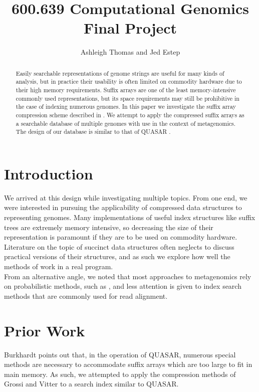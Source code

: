 \documentclass{article}
\begin{document}
\title{600.639 Computational Genomics\\
Final Project}
\date{}
\author{Ashleigh Thomas and Jed Estep}
\maketitle

\begin{abstract}
Easily searchable representations of genome strings are useful for many kinds of analysis, but in practice their usability is often limited on commodity hardware due to their high memory requirements. Suffix arrays are one of the least memory-intensive commonly used representations, but its space requirements may still be prohibitive in the case of indexing numerous genomes. In this paper we investigate the suffix array compression scheme described in \cite{GV05}. We attempt to apply the compressed suffix arrays as a searchable database of multiple genomes with use in the context of metagenomics. The design of our database is similar to that of QUASAR \cite{B99}.
\end{abstract}
\section{Introduction}
\label{sec-intro}
\indent We arrived at this design while investigating multiple topics. From one end, we were interested in pursuing the applicability of compressed data structures to representing genomes. Many implementations of useful index structures like suffix trees are extremely memory intensive, so decreasing the size of their representation is paramount if they are to be used on commodity hardware. Literature on the topic of succinct data structures often neglects to discuss practical versions of their structures, and as such we explore how well the methods of \cite{GV05} work in a real program.\\
\indent From an alternative angle, we noted that most approaches to metagenomics rely on probabilistic methods, such as \cite{BS09}, and less attention is given to index search methods that are commonly used for read alignment. 

\section{Prior Work}
\label{sec-prior-work}
Burkhardt \cite{B99} points out that, in the operation of QUASAR, numerous special methods are necessary to accommodate suffix arrays which are too large to fit in main memory. As such, we attempted to apply the compression methods of Grossi and Vitter \cite{GV05} to a search index similar to QUASAR.\\
\end{document}
